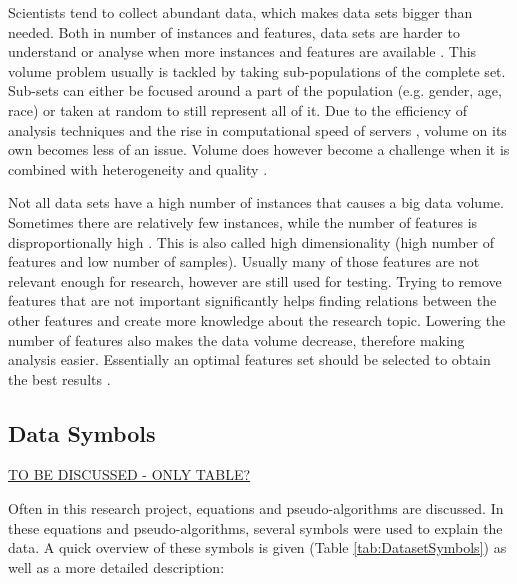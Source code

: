 \documentclass[10pt,a4paper]{report}
\begin{document}
	Scientists tend to collect abundant data, which makes data sets bigger than needed. Both in number of instances and features, data sets are harder to understand or analyse when more instances and features are available \cite{chen2006medical}. This volume problem usually is tackled by taking sub-populations of the complete set. Sub-sets can either be focused around a part of the population (e.g. gender, age, race) or taken at random to still represent all of it. Due to the efficiency of analysis techniques and the rise in computational speed of servers \cite{blythe2008rise}, volume on its own becomes less of an issue. Volume does however become a challenge when it is combined with heterogeneity and quality \cite{Turkay2014, Holzinger2014}.
	
	Not all data sets have a high number of instances that causes a big data volume. Sometimes there are relatively few instances, while the number of features is disproportionally high \cite{dubitzky2007fundamentals}. This is also called high dimensionality (high number of features and low number of samples). Usually many of those features are not relevant enough for research, however are still used for testing. Trying to remove features that are not important significantly helps finding relations between the other features and create more knowledge about the research topic. Lowering the number of features also makes the data volume decrease, therefore making analysis easier. Essentially an optimal features set should be selected to obtain the best results \cite{PENG201015}.	
	
	\subsection{Data Symbols}  \underline{TO BE DISCUSSED - ONLY TABLE?}
	\label{subsec:DataSymbols}
	
	Often in this research project, equations and pseudo-algorithms are discussed. In these equations and pseudo-algorithms, several symbols were used to explain the data. A quick overview of these symbols is given (Table \ref{tab:DatasetSymbols}) as well as a more detailed description:
	
\end{document}
